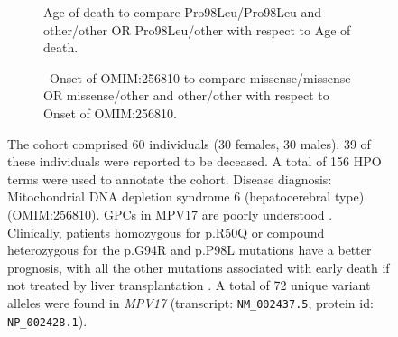 \begin{figure}[htbp]
\vspace{2em}

\begin{subfigure}[b]{0.95\textwidth}
\captionsetup{justification=raggedright,singlelinecheck=false}
\caption{Age of death to compare Pro98Leu/Pro98Leu and other/other OR Pro98Leu/other with respect to Age of death.}
\end{subfigure}

\vspace{2em}

\begin{subfigure}[b]{0.95\textwidth}
\captionsetup{justification=raggedright,singlelinecheck=false}
\caption{ Onset of OMIM:256810 to compare missense/missense OR missense/other and other/other with respect to Onset of OMIM:256810. }
\end{subfigure}

\vspace{2em}

\caption{ The cohort comprised 60 individuals (30 females, 30 males). 39 of these individuals were reported to be deceased. 
A total of 156 HPO terms were used to annotate the cohort. Disease diagnosis: Mitochondrial DNA depletion syndrome 6 (hepatocerebral type) (OMIM:256810). 
GPCs in MPV17 are poorly understood \cite{PMID_27536553}. Clinically, patients homozygous for p.R50Q or compound heterozygous for the
 p.G94R and p.P98L mutations have a better prognosis, with all the other mutations associated with early death if not treated by liver transplantation \cite{PMID_20074988}.
A total of 72 unique variant alleles were found in \textit{MPV17} (transcript: \texttt{NM\_002437.5}, protein id: \texttt{NP\_002428.1}).}
\end{figure}
